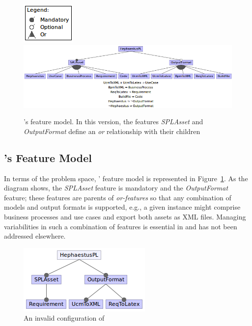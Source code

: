 \begin{figure}[t!]
\begin{center}
\includegraphics[width=.2\textwidth]{imagens/fm-hpl2.png}
\includegraphics[width=\textwidth]{imagens/fm-hpl1.png}
\end{center}
\caption{\hpl's feature model. In this version, the features \textit{SPLAsset} and \textit{OutputFormat} define an \emph{or} relationship with their children}
\label{fig:hephaestus-fm-03}
\end{figure}


\subsection{\hpl's Feature Model} 
\label{feature-model-hpl}

In terms of the problem space, \hpl' feature model is represented in Figure~\ref{fig:hephaestus-fm-03}. As the diagram shows, the \emph{SPLAsset} feature is mandatory and the \emph{OutputFormat} feature; these features are parents of \emph{or-features} so that any combination of models and output formats is supported, e.g., a given instance might comprise business processes and use cases and export both assets as XML files. Managing variabilities in such a combination of features is essential in \hpl{} and has not been addressed elsewhere.


\begin{figure}[t!]
\begin{center}
\includegraphics[scale=0.6]{imagens/confInvalid.png}
\end{center}
\caption{An invalid configuration of \hpl}
\label{fig:hephaestus-conf-invalid}
\end{figure}

